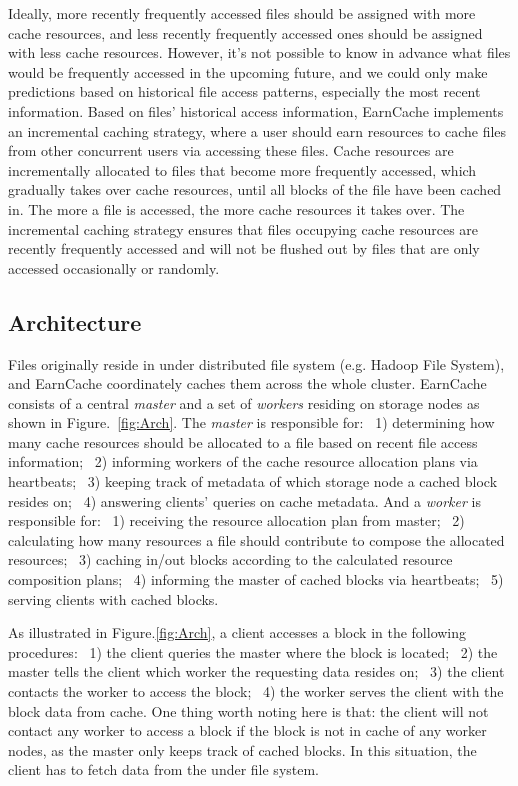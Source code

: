 Ideally, more recently frequently accessed files should be assigned with more cache resources, and less recently frequently accessed ones should be assigned with less cache resources. 
However, it's not possible to know in advance what files would be frequently accessed in the upcoming future,
and we could only make predictions based on historical file access patterns, especially the most recent information. Based on files' historical access information, EarnCache implements an incremental caching strategy, where a user should earn resources to cache files from other concurrent users via accessing these files. Cache resources are incrementally allocated to files that become more frequently accessed, which gradually takes over cache resources, until all blocks of the file have been cached in. The more a file is accessed, the more cache resources it takes over. 
The incremental caching strategy ensures that files occupying cache resources are recently frequently accessed and will not be flushed out by files that are only accessed occasionally or randomly.


\subsection{Architecture}\label{sec:Arch}
Files originally reside in under distributed file system (e.g. Hadoop File System), and EarnCache coordinately caches them across the whole cluster. EarnCache consists of a central \emph{master} and a set of \emph{workers} residing on storage nodes as shown in Figure.~\ref{fig:Arch}. The \emph{master} is responsible for: ~1) determining how many cache resources should be allocated to a file based on recent file access information; ~2) informing workers of the cache resource allocation plans via heartbeats; ~3) keeping track of metadata of which storage node a cached block resides on; ~4) answering clients' queries on cache metadata. 
And a \emph{worker} is responsible for: ~1) receiving the resource allocation plan from master; ~2) calculating how many resources a file should contribute to compose the allocated resources; ~3) caching in/out blocks according to the calculated resource composition plans; ~4) informing the master of cached blocks via heartbeats; ~5) serving clients with cached blocks.

As illustrated in Figure.\ref{fig:Arch}, a client accesses a block in the following procedures: ~1) the client queries the master where the block is located; ~2) the master tells the client which worker the requesting data resides on; ~3) the client contacts the worker to access the block; ~4) the worker serves the client with the block data from cache. 
One thing worth noting here is that: the client will not contact any worker to access a block if the block is not in cache of any worker nodes, as the master only keeps track of cached blocks.
In this situation, the client has to fetch data from the under file system.


